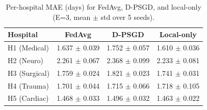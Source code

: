 \begin{table}[t]
\centering
\caption{Per-hospital MAE (days) for FedAvg, D-PSGD, and local-only (E=3, mean $\pm$ std over 5 seeds).}
\label{tab:per-hospital}
\begin{tabular}{lccc}
\toprule
Hospital & FedAvg & D-PSGD & Local-only \\
\midrule
H1 (Medical) & 1.637 $\pm$ 0.039 & 1.752 $\pm$ 0.057 & 1.610 $\pm$ 0.036 \\
H2 (Neuro) & 2.261 $\pm$ 0.067 & 2.368 $\pm$ 0.099 & 2.233 $\pm$ 0.081 \\
H3 (Surgical) & 1.759 $\pm$ 0.024 & 1.821 $\pm$ 0.023 & 1.741 $\pm$ 0.031 \\
H4 (Trauma) & 1.701 $\pm$ 0.044 & 1.715 $\pm$ 0.066 & 1.718 $\pm$ 0.105 \\
H5 (Cardiac) & 1.468 $\pm$ 0.033 & 1.496 $\pm$ 0.032 & 1.463 $\pm$ 0.022 \\
\bottomrule
\end{tabular}
\end{table}
